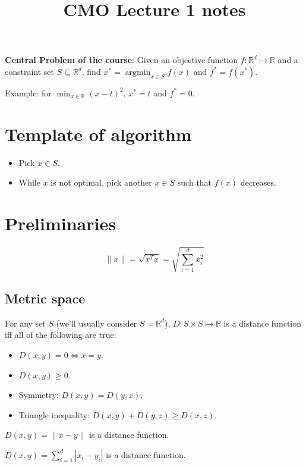 

\title{CMO Lecture 1 notes}



\maketitle
\initMinimal{}

\textbf{Central Problem of the course}:
Given an objective function $f: \mathbb{R}^d \mapsto \mathbb{R}$
and a constraint set $S \subseteq \mathbb{R}^d$,
find $x^* = \operatorname{argmin}_{x \in S} f(x)$ and $f^* = f(x^*)$.

Example: for $\min_{x \in \mathbb{R}} (x-t)^2$, $x^* = t$ and $f^* = 0$.

\tableofcontents

\section{Template of algorithm}

\begin{itemize}
\item Pick $x \in S$.
\item While $x$ is not optimal, pick another $x \in S$ such that $f(x)$ decreases.
\end{itemize}

\section{Preliminaries}

\[ \|x\| = \sqrt{x^Tx} = \sqrt{\sum_{i=1}^d x_i^2} \]

\subsection{Metric space}

For any set $S$ (we'll usually consider $S = \mathbb{R}^d$),
$D: S \times S \mapsto \mathbb{R}$ is a distance function
iff all of the following are true:
\begin{itemize}
\item $D(x, y) = 0 \iff x = y$.
\item $D(x, y) \ge 0$.
\item Symmetry: $D(x, y) = D(y, x)$.
\item Triangle inequality: $D(x, y) + D(y, z) \ge D(x, z)$.
\end{itemize}

\begin{theorem}$D(x, y) = \|x - y\|$ is a distance function.\end{theorem}
\begin{theorem}$D(x, y) = \sum_{i=1}^d |x_i - y_i|$ is a distance function.\end{theorem}

